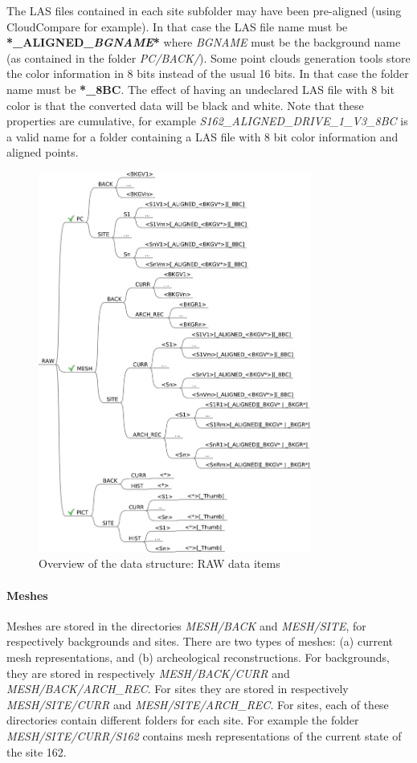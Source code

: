 The LAS files contained in each site subfolder may have been pre-aligned (using CloudCompare for example). In that case the LAS file name must be \textbf{*\_ALIGNED\_\textit{BGNAME}*} where \textit{BGNAME} must be the background name (as contained in the folder \textit{PC/BACK/}).
Some point clouds generation tools store the color information in 8 bits instead of the usual 16 bits. In that case the folder name must be \textbf{*\_8BC}. The effect of having an undeclared LAS file with 8 bit color is that the converted data will be black and white. Note that these properties are cumulative, for example \textit{S162\_ALIGNED\_DRIVE\_1\_V3\_8BC} is a valid name for a folder containing a LAS file with 8 bit color information and aligned points.

\begin{figure}[]
 \centering
 \includegraphics[width=0.8\textwidth]{fig/data_structure/directory_structure_raw}
 \caption{Overview of the data structure: RAW data items}
 \label{fig:directory_structure_overview_raw}
\end{figure}


\paragraph{Meshes}
Meshes are stored in the directories \textit{MESH/BACK} and \textit{MESH/SITE}, for respectively backgrounds and sites. There are two types of meshes: (a) current  mesh representations, and (b) archeological reconstructions. For backgrounds, they are stored in respectively \textit{MESH/BACK/CURR} and \textit{MESH/BACK/ARCH\_REC}. For sites they are stored in respectively \textit{MESH/SITE/CURR} and \textit{MESH/SITE/ARCH\_REC}. For sites, each of these directories contain different folders for each site. For example the folder \textit{MESH/SITE/CURR/S162} contains mesh representations of the current state of the site 162. 

